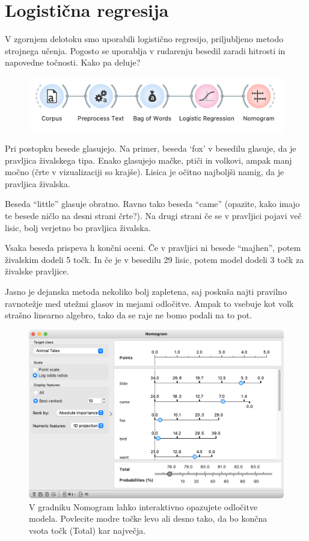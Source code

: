 \chapter{Logistična regresija}
\label{ch:logistic-regression}

V zgornjem delotoku smo uporabili logistično regresijo, priljubljeno metodo strojnega učenja. Pogosto se uporablja v rudarenju besedil zaradi hitrosti in napovedne točnosti. Kako pa deluje?

\begin{figure}
    \includegraphics[width=\textwidth]{logisticna-workflow.png}
    \caption{ }
\end{figure}

Pri postopku besede glasujejo. Na primer, beseda ‘fox’ v besedilu glasuje, da je pravljica živalskega tipa. Enako glasujejo mačke, ptiči in volkovi, ampak manj močno (črte v vizualizaciji so krajše). Lisica je očitno najboljši namig, da je pravljica živalska.

Beseda ``little'' glasuje obratno. Ravno tako beseda ``came'' (opazite, kako imajo te besede ničlo na desni strani črte?). Na drugi strani če se v pravljici pojavi več lisic, bolj verjetno bo pravljica živalska.

Vsaka beseda prispeva h končni oceni. Če v pravljici ni besede ``majhen'', potem živalskim dodeli 5 točk. In če je v besedilu 29 lisic, potem model dodeli 3 točk za živalske pravljice. 

Jasno je dejanska metoda nekoliko bolj zapletena, saj poskuša najti pravilno ravnotežje med utežmi glasov in mejami odločitve. Ampak to vsebuje kot volk strašno linearno algebro, tako da se raje ne bomo podali na to pot.

\begin{figure}
    \includegraphics[width=\textwidth]{nomogram.png}
    \caption{V gradniku Nomogram lahko interaktivno opazujete odločitve modela. Povlecite modre točke levo ali desno tako, da bo končna vsota točk (Total) kar največja.}
\end{figure}
